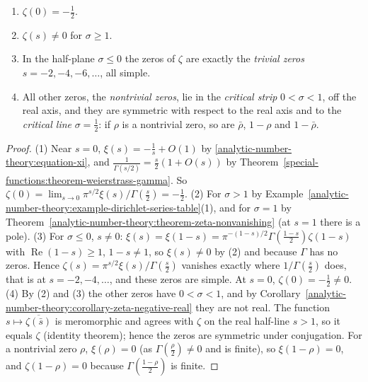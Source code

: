 \begin{corollary}\label{analytic-number-theory:corollary-zeros}
\begin{enumerate}
\item $\zeta(0) = -\frac12$.
\item $\zeta(s) \neq 0$ for $\sigma \geq 1$.
\item In the half-plane $\sigma \leq 0$ the zeros of $\zeta$ are exactly the \emph{trivial zeros} $s = -2, -4, -6, \ldots$, all simple.
\item All other zeros, the \emph{nontrivial zeros}, lie in the \emph{critical strip} $0 < \sigma < 1$, off the real axis, and they are symmetric with respect to the real axis and to the
\emph{critical line} $\sigma = \frac12$: if $\rho$ is a nontrivial zero, so are $\bar\rho$, $1 - \rho$ and $1 - \bar\rho$.
\end{enumerate}
\end{corollary}

\begin{proof}
(1) Near $s = 0$, $\xi(s) = -\frac1s + O(1)$ by \eqref{analytic-number-theory:equation-xi}, and $\frac{1}{\Gamma(s/2)} = \frac s2(1 + O(s))$ by Theorem~\ref{special-functions:theorem-weierstrass-gamma}. So
$\zeta(0) = \lim_{s \to 0}\pi^{s/2}\xi(s)/\Gamma(\frac s2) = -\frac12$.
(2) For $\sigma > 1$ by Example~\ref{analytic-number-theory:example-dirichlet-series-table}(1), and for $\sigma = 1$ by Theorem~\ref{analytic-number-theory:theorem-zeta-nonvanishing} (at $s = 1$ there is a pole).
(3) For $\sigma \leq 0$, $s \neq 0$: $\xi(s) = \xi(1 - s) = \pi^{-(1-s)/2}\Gamma(\frac{1 - s}2)\zeta(1 - s)$ with $\operatorname{Re}(1 - s) \geq 1$, $1 - s \neq 1$, so $\xi(s) \neq 0$ by (2) and
because $\Gamma$ has no zeros. Hence $\zeta(s) = \pi^{s/2}\xi(s)/\Gamma(\frac s2)$ vanishes exactly where $1/\Gamma(\frac s2)$ does, that is at $s = -2, -4, \ldots$, and these zeros are simple. At $s = 0$,
$\zeta(0) = -\frac12 \neq 0$.
(4) By (2) and (3) the other zeros have $0 < \sigma < 1$, and by Corollary~\ref{analytic-number-theory:corollary-zeta-negative-real} they are not real. The function $s \mapsto \overline{\zeta(\bar s)}$ is
meromorphic and agrees with $\zeta$ on the real half-line $s > 1$, so it equals $\zeta$ (identity theorem); hence the zeros are symmetric under conjugation. For a nontrivial zero $\rho$,
$\xi(\rho) = 0$ (as $\Gamma(\frac\rho2) \neq 0$ and is finite), so $\xi(1 - \rho) = 0$, and $\zeta(1 - \rho) = 0$ because $\Gamma(\frac{1 - \rho}2)$ is finite.
\end{proof}

